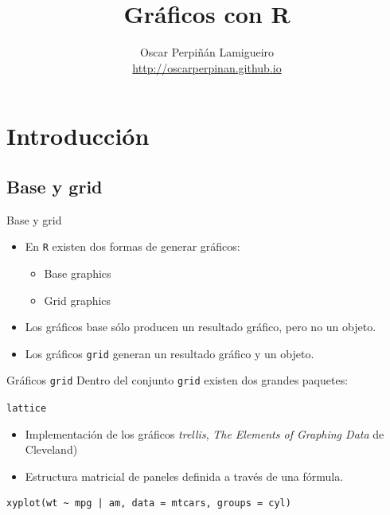 \documentclass[xcolor={usenames,svgnames,dvipsnames}]{beamer}
\author{Oscar Perpiñán Lamigueiro \\ \url{http://oscarperpinan.github.io}}
\date{}
\title{Gráficos con R}
\begin{document}
\maketitle


\section{Introducción}
\label{sec-1}
\subsection{Base y grid}
\label{sec-1-1}
\begin{frame}[fragile,label=sec-1-1-1]{Base y grid}
 \begin{itemize}
\item En \texttt{R} existen dos formas de generar gráficos:
\begin{itemize}
\item Base graphics
\item Grid graphics
\end{itemize}
\item Los gráficos base sólo producen un resultado gráfico, pero no un objeto.
\item Los gráficos \texttt{grid} generan un resultado gráfico \alert{y} un objeto.
\end{itemize}
\end{frame}

\begin{frame}[fragile,label=sec-1-1-2]{Gráficos \texttt{grid}}
 Dentro del conjunto \texttt{grid} existen dos grandes paquetes:

\begin{block}{\texttt{lattice}}
\begin{itemize}
\item Implementación de los gráficos \emph{trellis}, \emph{The Elements of Graphing Data} de Cleveland)

\item Estructura matricial de paneles definida a través de una fórmula.
\end{itemize}

\lstset{language=R,label= ,caption= ,numbers=none}
\begin{lstlisting}
xyplot(wt ~ mpg | am, data = mtcars, groups = cyl)
\end{lstlisting}
\end{block}
\end{frame}
\end{document}
